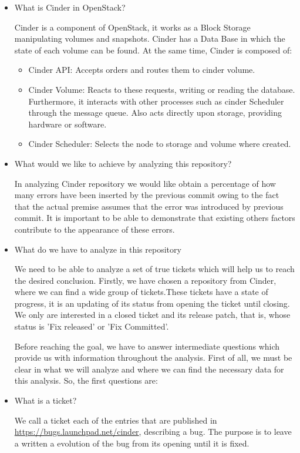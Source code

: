 \documentclass[a4paper]{article}
\begin{document}
\begin{itemize}
\item What is Cinder in OpenStack?

Cinder is a component of OpenStack, it works as a Block Storage manipulating volumes and snapshots. Cinder has a Data Base in which the state of each volume can be found.
At the same time, Cinder is composed of:

\begin{itemize}
    \item Cinder API: Accepts orders and routes them to cinder volume.
    \item Cinder Volume: Reacts to these requests, writing or reading the database. Furthermore, it interacts with other processes such as cinder Scheduler through the message queue. Also acts directly upon storage, providing hardware or software.
    \item Cinder Scheduler: Selects the node to storage and volume where created.
\end{itemize}

\item What would we like to achieve by analyzing this repository?

In analyzing Cinder repository we would like obtain a percentage of how many errors have been inserted by the previous commit owing to the fact that the actual premise assumes that the error was introduced by previous commit.
It is important to be able to demonstrate that existing others factors contribute to the appearance of these errors. 

\item What do we have to analyze in this repository

We need to be able to analyze a set of true tickets which will help us to reach the desired conclusion. Firstly, we have chosen a repository from Cinder, where we can find a wide group of tickets.These tickets have a state of progress, it is an updating of its status from opening the ticket until closing.  We only are interested in a closed ticket and its release patch,  that is, whose status is 'Fix released' or 'Fix Committed'.

Before reaching the goal, we have to answer intermediate questions which provide us with information throughout the analysis. 
First of all, we must be clear in what we will analyze and where we can find the necessary data for this analysis. So, the first questions are:


\item What is a ticket?

We call a ticket each of the entries that are published in \url{https://bugs.launchpad.net/cinder}, describing a bug. The purpose is to leave a written a evolution of the bug from its opening until it is fixed.


\end{itemize}
\end{document}
